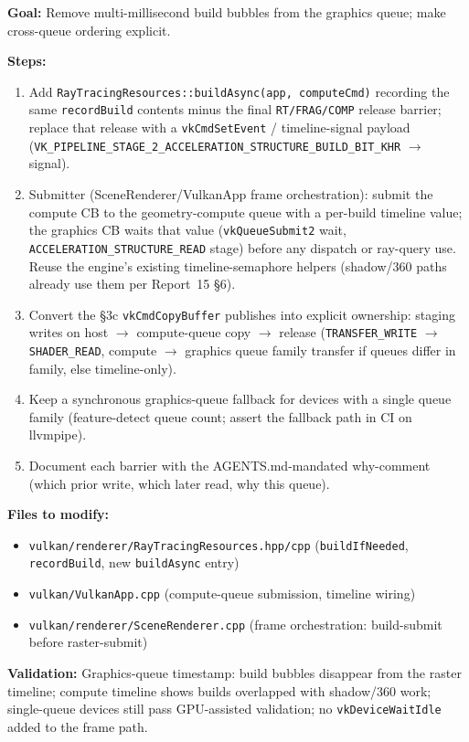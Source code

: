 \documentclass[11pt,a4paper]{article}
\begin{document}
\begin{tcolorbox}[promptbox={Prompt: Move AS Builds to the Geometry-Compute Queue}]
\textbf{Goal:} Remove multi-millisecond build bubbles from the graphics queue; make cross-queue ordering explicit.

\textbf{Steps:}
\begin{enumerate}
    \item Add \texttt{RayTracingResources::buildAsync(app, computeCmd)} recording the same \texttt{recordBuild} contents minus the final \texttt{RT/FRAG/COMP} release barrier; replace that release with a \texttt{vkCmdSetEvent} / timeline-signal payload (\texttt{VK\_PIPELINE\_STAGE\_2\_ACCELERATION\_STRUCTURE\_BUILD\_BIT\_KHR} $\rightarrow$ signal).
    \item Submitter (SceneRenderer/VulkanApp frame orchestration): submit the compute CB to the geometry-compute queue with a per-build timeline value; the graphics CB waits that value (\texttt{vkQueueSubmit2} wait, \texttt{ACCELERATION\_STRUCTURE\_READ} stage) before any dispatch or ray-query use. Reuse the engine's existing timeline-semaphore helpers (shadow/360 paths already use them per Report~15 \S6).
    \item Convert the \S3c \texttt{vkCmdCopyBuffer} publishes into explicit ownership: staging writes on host $\rightarrow$ compute-queue copy $\rightarrow$ release (\texttt{TRANSFER\_WRITE} $\rightarrow$ \texttt{SHADER\_READ}, compute $\rightarrow$ graphics queue family transfer if queues differ in family, else timeline-only).
    \item Keep a synchronous graphics-queue fallback for devices with a single queue family (feature-detect queue count; assert the fallback path in CI on llvmpipe).
    \item Document each barrier with the AGENTS.md-mandated why-comment (which prior write, which later read, why this queue).
\end{enumerate}

\textbf{Files to modify:}
\begin{itemize}
    \item \texttt{vulkan/renderer/RayTracingResources.hpp/cpp} (\texttt{buildIfNeeded}, \texttt{recordBuild}, new \texttt{buildAsync} entry)
    \item \texttt{vulkan/VulkanApp.cpp} (compute-queue submission, timeline wiring)
    \item \texttt{vulkan/renderer/SceneRenderer.cpp} (frame orchestration: build-submit before raster-submit)
\end{itemize}

\textbf{Validation:} Graphics-queue timestamp: build bubbles disappear from the raster timeline; compute timeline shows builds overlapped with shadow/360 work; single-queue devices still pass GPU-assisted validation; no \texttt{vkDeviceWaitIdle} added to the frame path.
\end{tcolorbox}
\end{document}
